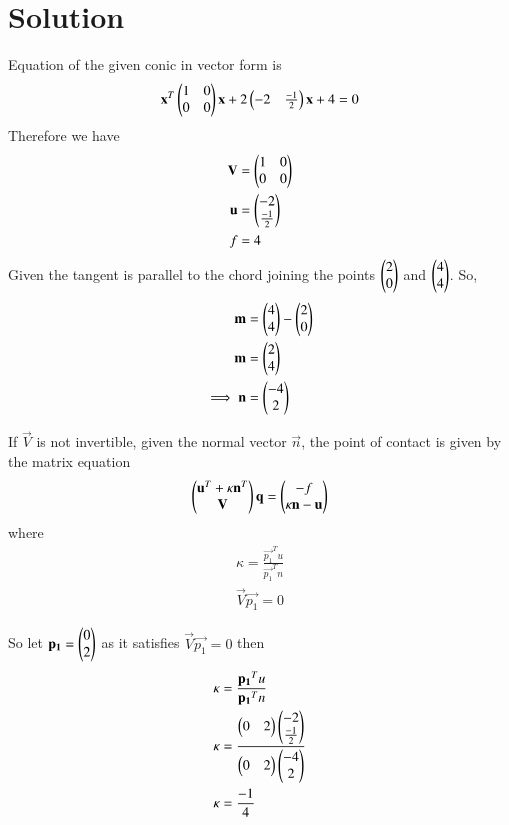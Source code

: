 \documentclass[journal,12pt,twocolumn]{IEEEtran}
\begin{document}
\section{Solution}
Equation of the given conic in vector form is 
\begin{align}
    \mathbf{x}^T\begin{pmatrix}1 &0\\0 &0\end{pmatrix}\mathbf{x}+2\begin{pmatrix}-2 &\frac{-1}{2}\end{pmatrix}\mathbf{x}+4=0 \label{a}
\end{align}
Therefore we have
\begin{align}
    \mathbf{V} &= \begin{pmatrix}1 &0\\0 &0\end{pmatrix}\\
    \mathbf{u} &= \begin{pmatrix}-2 \\ \frac{-1}{2}\end{pmatrix}\\
    f &= 4
\end{align}
Given the tangent is parallel to the chord joining the points $\begin{pmatrix}2\\0\end{pmatrix}$ and $\begin{pmatrix}4\\4\end{pmatrix}$. So,
\begin{align}
    \mathbf{m} &= \begin{pmatrix}4\\4\end{pmatrix} - \begin{pmatrix}2\\0\end{pmatrix}\\
    \mathbf{m} &= \begin{pmatrix}2\\4\end{pmatrix}\\
    \implies \mathbf{n} &= \begin{pmatrix}-4\\2\end{pmatrix}
\end{align}
\begin{lemma}
If $\vec{V}$ is not invertible, given the normal vector $\vec{n}$, the point of contact is given by the matrix equation
\begin{align}
    \begin{pmatrix}\mathbf{u}^T+\kappa\mathbf{n}^T\\\mathbf{V}\end{pmatrix}\mathbf{q} = \begin{pmatrix}-f\\ \kappa\mathbf{n}-\mathbf{u}\end{pmatrix} 
\end{align} 
where
\begin{align}
    \kappa = \frac{\vec{p_1}^Tu}{\vec{p_1}^Tn}\\
    \vec{V}\vec{p_1}=0
\end{align}
\end{lemma}
So let $\mathbf{p_1} = \begin{pmatrix}0\\2\end{pmatrix}$ as it satisfies $\vec{V}\vec{p_1}=0$ then
\begin{align}
    \kappa &= \frac{\mathbf{p_1}^Tu}{\mathbf{p_1}^Tn}\\
    \kappa &= \frac{\begin{pmatrix}0 &2\end{pmatrix}\begin{pmatrix}-2\\\frac{-1}{2}\end{pmatrix}}{\begin{pmatrix}0 &2\end{pmatrix}\begin{pmatrix}-4\\2\end{pmatrix}}\\
    \kappa &= \frac{-1}{4}
\end{align}
\end{document}
